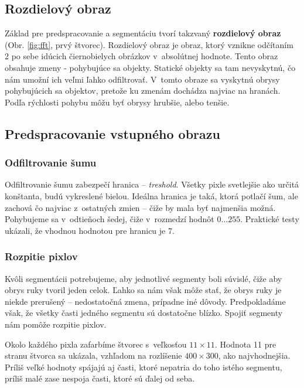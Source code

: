\subsection{Rozdielový obraz}
\label{chap:diffimg}

Základ pre predspracovanie a segmentáciu tvorí takzvaný \textbf{rozdielový obraz} (Obr. \ref{fig:fft}, prvý štvorec). Rozdielový obraz je obraz, ktorý vznikne odčítaním 2 po sebe idúcich čiernobielych obrázkov v~absolútnej hodnote. Tento obraz obsahuje zmeny - pohybujúce sa objekty. Statické objekty sa tam nevyskytnú, čo nám umožní ich veľmi ľahko odfiltrovať. V~tomto obraze sa vyskytnú obrysy pohybujúcich sa objektov, pretože ku zmenám dochádza najviac na hranách. Podľa rýchlosti pohybu môžu byť obrysy hrubšie, alebo tenšie. 

\subsection{Predspracovanie vstupného obrazu}
\label{chap:preprocess}

\subsubsection{Odfiltrovanie šumu}
Odfiltrovanie šumu zabezpečí hranica -- \textit{treshold}. Všetky pixle svetlejšie ako určitá konštanta, budú vykreslené bielou. Ideálna hranica je taká, ktorá potlačí šum, ale zachová čo najviac z~ostatných zmien -- čiže by mala byť najmenšia možná. Pohybujeme sa v~odtieňoch šedej, čiže v~rozmedzí hodnôt $0\dots 255$. Praktické testy ukázali, že vhodnou hodnotou pre hranicu je 7.

\subsubsection{Rozpitie pixlov}

Kvôli segmentácii potrebujeme, aby jednotlivé segmenty boli súvislé, čiže aby obrys ruky tvoril jeden celok.
Ľahko sa nám však môže stať, že obrys ruky je niekde prerušený -- nedostatočná zmena, prípadne iné dôvody. Predpokladáme však, že všetky časti jedného segmentu sú dostatočne blízko. Spojiť segmenty nám pomôže rozpitie pixlov. 

Okolo každého pixla zafarbíme štvorec s~veľkosťou $11\times 11$.
Hodnota 11 pre stranu štvorca sa ukázala, vzhľadom na rozlíšenie $400\times 300$, ako najvhodnejšia.
Príliš veľké hodnoty spájajú aj časti, ktoré nepatria do toho istého segmentu, príliš malé zase nespoja časti, ktoré sú ďalej od seba.

